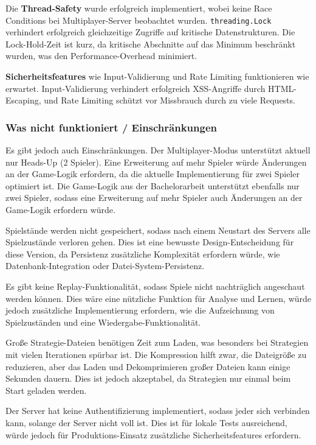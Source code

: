 Die \textbf{Thread-Safety} wurde erfolgreich implementiert, wobei keine Race Conditions bei Multiplayer-Server beobachtet wurden.
\texttt{threading.Lock} verhindert erfolgreich gleichzeitige Zugriffe auf kritische Datenstrukturen.
Die Lock-Hold-Zeit ist kurz, da kritische Abschnitte auf das Minimum beschränkt wurden, was den Performance-Overhead minimiert.

\textbf{Sicherheitsfeatures} wie Input-Validierung und Rate Limiting funktionieren wie erwartet.
Input-Validierung verhindert erfolgreich XSS-Angriffe durch HTML-Escaping, und Rate Limiting schützt vor Missbrauch durch zu viele Requests.

\subsubsection{Was nicht funktioniert / Einschränkungen}

Es gibt jedoch auch Einschränkungen.
Der Multiplayer-Modus unterstützt aktuell nur Heads-Up (2 Spieler).
Eine Erweiterung auf mehr Spieler würde Änderungen an der Game-Logik erfordern, da die aktuelle Implementierung für zwei Spieler optimiert ist.
Die Game-Logik aus der Bachelorarbeit unterstützt ebenfalls nur zwei Spieler, sodass eine Erweiterung auf mehr Spieler auch Änderungen an der Game-Logik erfordern würde.

Spielstände werden nicht gespeichert, sodass nach einem Neustart des Servers alle Spielzustände verloren gehen.
Dies ist eine bewusste Design-Entscheidung für diese Version, da Persistenz zusätzliche Komplexität erfordern würde, wie Datenbank-Integration oder Datei-System-Persistenz.

Es gibt keine Replay-Funktionalität, sodass Spiele nicht nachträglich angeschaut werden können.
Dies wäre eine nützliche Funktion für Analyse und Lernen, würde jedoch zusätzliche Implementierung erfordern, wie die Aufzeichnung von Spielzuständen und eine Wiedergabe-Funktionalität.

Große Strategie-Dateien benötigen Zeit zum Laden, was besonders bei Strategien mit vielen Iterationen spürbar ist.
Die Kompression hilft zwar, die Dateigröße zu reduzieren, aber das Laden und Dekomprimieren großer Dateien kann einige Sekunden dauern.
Dies ist jedoch akzeptabel, da Strategien nur einmal beim Start geladen werden.

Der Server hat keine Authentifizierung implementiert, sodass jeder sich verbinden kann, solange der Server nicht voll ist.
Dies ist für lokale Tests ausreichend, würde jedoch für Produktions-Einsatz zusätzliche Sicherheitsfeatures erfordern.


